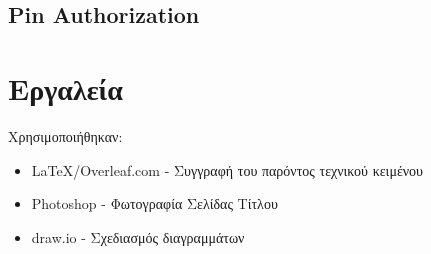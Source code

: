 \documentclass{article}
\begin{document}
\subsection{Pin Authorization}
\noindent{}

\newpage

\section{Εργαλεία}
Χρησιμοποιήθηκαν:
\begin{itemize}
    \item \LaTeX/Overleaf.com - Συγγραφή του παρόντος τεχνικού κειμένου
    \item Photoshop - Φωτογραφία Σελίδας Τίτλου
    \item draw.io - Σχεδιασμός διαγραμμάτων
\end{itemize}
\end{document}
